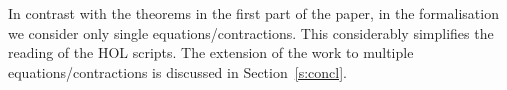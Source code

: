 In contrast with the theorems in the first part of the paper, in the
formalisation we consider only single equations/contractions. 
This considerably simplifies the  reading of the HOL scripts. 
The extension of the work to multiple equations/contractions is
discussed in Section~\ref{s:concl}.




